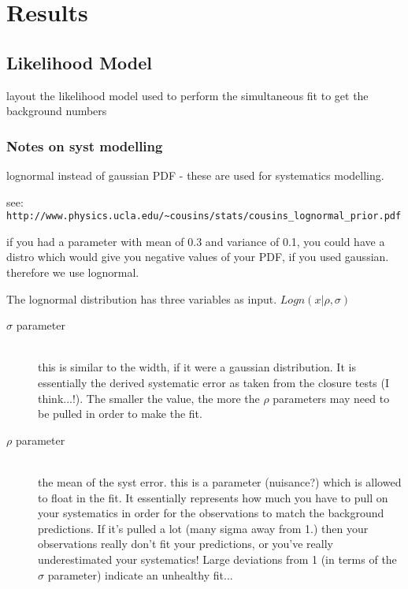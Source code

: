 \chapter{Results}
\label{ch:7}

\ifpdf
    \graphicspath{{Chapter7/Figs/Raster/}{Chapter7/Figs/PDF/}{Chapter7/Figs/}}
\else
    \graphicspath{{Chapter7/Figs/Vector/}{Chapter7/Figs/}}
\fi


\section{Likelihood Model}  %
\label{sec:results_likelihood}
layout the likelihood model used to perform the simultaneous fit to get the 
background numbers


\subsection{Notes on syst modelling}
lognormal instead of gaussian PDF - these are used for systematics modelling.

see:
\verb!http://www.physics.ucla.edu/~cousins/stats/cousins_lognormal_prior.pdf!

if you had a parameter with mean of 0.3 and variance of 0.1, you could have a 
distro which would give you negative values of your PDF, if you used gaussian. 
therefore we use lognormal.

The lognormal distribution has three variables as input. $Logn(x|\rho, \sigma)$

\begin{description}
\item[$\sigma$ parameter]\hfill \\ this is similar to the width, if it were a gaussian 
distribution. It is essentially the derived systematic error as taken from the 
closure tests (I think...!). The smaller the value, the more the $\rho$ 
parameters may need to be pulled in order to make the fit.
\item[$\rho$ parameter] \hfill \\ the mean of the syst error. this is a parameter
(nuisance?) which is allowed to float in the fit. It essentially represents how 
much you have to pull on your systematics in order for the observations to match
the background predictions. If it's pulled a lot (many sigma away from 1.) then 
your observations really don't fit your predictions, or you've really 
underestimated your systematics! Large deviations from 1 (in terms of the
$\sigma$ parameter) indicate an unhealthy fit...
\end{description}



